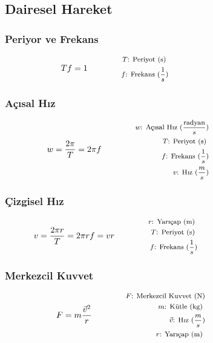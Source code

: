 \subsection{Dairesel Hareket}

\subsubsection*{Periyor ve Frekans}
\begin{equation}
    Tf = 1 \qquad \qquad \parbox{5.5cm}{\footnotesize$\begin{aligned}
        T\text{: Periyot (s) } \\
        f\text{: Frekans } (\frac{1}{s})
\end{aligned}$}
\end{equation}

\subsubsection*{Açısal Hız}
\begin{equation}
    w  = \frac{2\pi}{T} = 2 \pi f \qquad \qquad \parbox{5.5cm}{\footnotesize$\begin{aligned}
        w\text{: Açısal Hız } (\frac{\text{radyan}}{s}) \\
        T\text{: Periyot (s) } \\
        f\text{: Frekans } (\frac{1}{s}) \\
        v\text{: Hız } (\frac{m}{s})
\end{aligned}$}
\end{equation}

\subsubsection*{Çizgisel Hız}
\begin{equation}
    v = \frac{2 \pi r}{T} = 2 \pi r f = v r  \qquad \qquad \parbox{5.5cm}{\footnotesize$\begin{aligned}
        r\text{: Yarıçap (m) } \\
        T\text{: Periyot (s) } \\
        f\text{: Frekans } (\frac{1}{s})
\end{aligned}$}
\end{equation}

\subsubsection*{Merkezcil Kuvvet}
\begin{equation}
    F = m \frac{\vec{v}^2}{r} \qquad \qquad \parbox{5.5cm}{\footnotesize$\begin{aligned}
        F\text{: Merkezcil Kuvvet (N)} \\
        m\text{: Kütle (kg) } \\
        \vec{v}\text{: Hız } (\frac{m}{s}) \\
        r\text{: Yarıçap (m) }
\end{aligned}$}
\end{equation}

